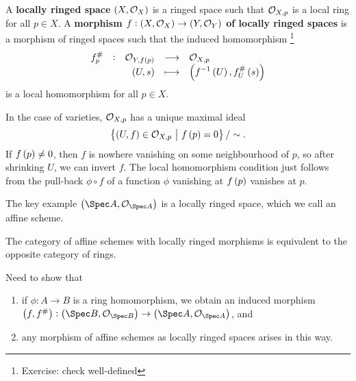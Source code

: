 \begin{definition*}
A \textbf{locally ringed space} $ \br{X, \OOO_X} $ is a ringed space such that $ \mathcal{O}_{X, p} $ is a local ring for all $ p \in X $. A \textbf{morphism $ f : \br{X, \OOO_X} \to \br{Y, \OOO_Y} $ of locally ringed spaces} is a morphism of ringed spaces such that the induced homomorphism \footnote{Exercise: check well-defined}
$$ \function[f_p^\#]{\OOO_{Y, f\br{p}}}{\OOO_{X, p}}{\br{U, s}}{\br{f^{-1}\br{U}, f_U^\#\br{s}}} $$
is a local homomorphism for all $ p \in X $.
\end{definition*}

\begin{example*}
In the case of varieties, $ \mathcal{O}_{X, p} $ has a unique maximal ideal
$$ \cbr{\br{U, f} \in \OOO_{X, p} \st f\br{p} = 0} / \sim. $$
If $ f\br{p} \ne 0 $, then $ f $ is nowhere vanishing on some neighbourhood of $ p $, so after shrinking $ U $, we can invert $ f $. The local homomorphism condition just follows from the pull-back $ \phi \circ f $ of a function $ \phi $ vanishing at $ f\br{p} $ vanishes at $ p $.
\end{example*}


The key example $ \br{\Spec A, \OOO_{\Spec A}} $ is a locally ringed space, which we call an affine scheme.

\begin{theorem}
The category of affine schemes with locally ringed morphisms is equivalent to the opposite category of rings.
\end{theorem}

Need to show that
\begin{enumerate}
\item if $ \phi : A \to B $ is a ring homomorphism, we obtain an induced morphism $ \br{f, f^\#} : \br{\Spec B, \OOO_{\Spec B}} \to \br{\Spec A, \OOO_{\Spec A}} $, and
\item any morphism of affine schemes as locally ringed spaces arises in this way.
\end{enumerate}

\pagebreak

